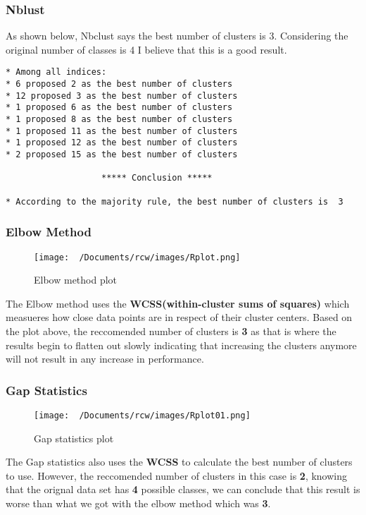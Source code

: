 \documentclass[12pt]{article}
\begin{document}
\subsubsection{Nblust}
As shown below, Nbclust says the best number of clusters is 3. Considering the original number of classes is 4 I believe that this is a good result.
\begin{lstlisting}
* Among all indices:                                                
* 6 proposed 2 as the best number of clusters 
* 12 proposed 3 as the best number of clusters 
* 1 proposed 6 as the best number of clusters 
* 1 proposed 8 as the best number of clusters 
* 1 proposed 11 as the best number of clusters 
* 1 proposed 12 as the best number of clusters 
* 2 proposed 15 as the best number of clusters 

                   ***** Conclusion *****                            
 
* According to the majority rule, the best number of clusters is  3 
\end{lstlisting}

\subsubsection{Elbow Method}
\begin{figure}[H]
  \centering
  \texttt{[image: ~/Documents/rcw/images/Rplot.png]}
  \caption{Elbow method plot}
\end{figure}

The Elbow method uses the \textbf{WCSS(within-cluster sums of squares)} which measueres how close data points are in respect of their cluster centers.
Based on the plot above, the reccomended number of clusters is \textbf{3} as that is where the results begin to flatten out slowly
indicating that increasing the clusters anymore will not result in any increase in performance.

\subsubsection{Gap Statistics}
\begin{figure}[H]
  \centering
  \texttt{[image: ~/Documents/rcw/images/Rplot01.png]}
  \caption{Gap statistics plot}
\end{figure}

The Gap statistics also uses the \textbf{WCSS} to calculate the best number of clusters to use.  
However, the reccomended number of clusters in this case is \textbf{2}, knowing that the orignal data set has \textbf{4} possible classes,
we can conclude that this result is worse than what we got with the elbow method which was \textbf{3}.
\end{document}
